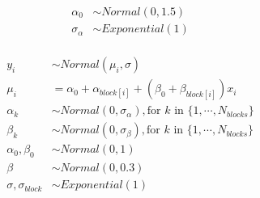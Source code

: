 \documentclass[10pt]{book}
\begin{document}
\begin{mdSnippets}
\begin{mdDisplaySnippet}[7ccaec10ea83f691336451fc3076df69]
\[\begin{aligned}
\alpha_0 &\sim Normal(0, 1.5) \\
\sigma_{\alpha} &\sim Exponential(1) \\
\end{aligned}
\]%
\end{mdDisplaySnippet}%
\begin{mdDisplaySnippet}[61f2e03d24c1695f37c2b02d17db7c3f]%
\[%
\begin{aligned}
y_i &\sim Normal(\mu_i, \sigma) \\ 
\mu_i &= \alpha_0 + \alpha_{block[i]} + (\beta_0 + \beta_{block[i]}) x_i \\ 
\alpha_k &\sim Normal(0, \sigma_{\alpha}), \text{for $k$ in } \{1,\cdots ,N_{blocks}\} \\
\beta_k &\sim Normal(0, \sigma_{\beta}), \text{for $k$ in } \{1,\cdots ,N_{blocks}\} \\ 
\alpha_0, \beta_0 &\sim Normal(0, 1) \\
\beta &\sim Normal(0, 0.3) \\
\sigma, \sigma_{block} &\sim Exponential(1) \\
\end{aligned}
\]%
\end{mdDisplaySnippet}%

\end{mdSnippets}
\end{document}

